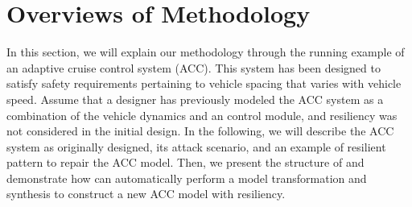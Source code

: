 \section{Overviews of Methodology}
%
%
In this section, we will explain our methodology through the running example of an adaptive cruise control system (ACC). This system has been designed to satisfy safety requirements pertaining to vehicle spacing that varies with vehicle speed.
%
Assume that a designer has previously modeled the ACC system as a combination of the vehicle dynamics and an control module, and resiliency was not considered in the initial design. In the following, we will describe the ACC system as originally designed, its attack scenario, and an example of resilient pattern to repair the ACC model.
%
Then, we present the structure of \toolreaffirm and demonstrate how \toolreaffirm can automatically perform a model transformation and synthesis to construct a new ACC model with resiliency. 
%
%
%

